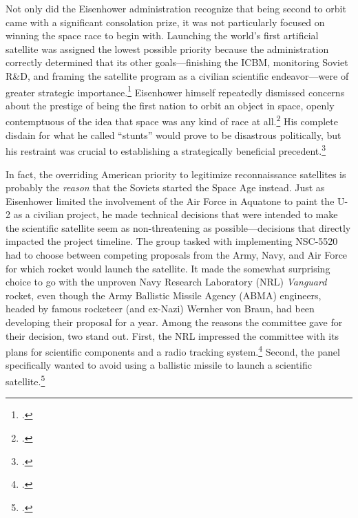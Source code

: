 \documentclass[14pt]{extarticle}
\begin{document}
Not only did the Eisenhower administration recognize that being second to orbit came with a significant consolation prize, it was not particularly focused on winning the space race to begin with. Launching the world's first artificial satellite was assigned the lowest possible priority because the administration correctly determined that its other goals---finishing the ICBM, monitoring Soviet R\&D, and framing the satellite program as a civilian scientific endeavor---were of greater strategic importance.\footcite[p.~123-124]{mcdougall_heavens_1985} Eisenhower himself repeatedly dismissed concerns about the prestige of being the first nation to orbit an object in space, openly contemptuous of the idea that space was any kind of race at all.\footcite[p.~100]{lindgren_trust_2000} His complete disdain for what he called ``stunts'' would prove to be disastrous politically, but his restraint was crucial to establishing a strategically beneficial precedent.\footcite[p.~134]{day_eye_2015}

In fact, the overriding American priority to legitimize reconnaissance satellites is probably the \emph{reason} that the Soviets started the Space Age instead. Just as Eisenhower limited the involvement of the Air Force in Aquatone to paint the U-2 as a civilian project, he made technical decisions that were intended to make the scientific satellite seem as non-threatening as possible---decisions that directly impacted the project timeline. The group tasked with implementing NSC-5520 had to choose between competing proposals from the Army, Navy, and Air Force for which rocket would launch the satellite. It made the somewhat surprising choice to go with the unproven Navy Research Laboratory (NRL) \emph{Vanguard} rocket, even though the Army Ballistic Missile Agency (ABMA) engineers, headed by famous rocketeer (and ex-Nazi) Wernher von Braun, had been developing their proposal for a year. Among the reasons the committee gave for their decision, two stand out. First, the NRL impressed the committee with its plans for scientific components and a radio tracking system.\footcite[p.~122]{mcdougall_heavens_1985} Second, the panel specifically wanted to avoid using a ballistic missile to launch a scientific satellite.\footcite[p.~129. Though the NRL is run by the Navy, it functioned like a civilian scientific operation and all parties involved believed that the NRL proposal would be seen as a civilian project---especially in comparison with its competetor, the Army agency building nuclear delivery systems.]{day_eye_2015}
\end{document}
